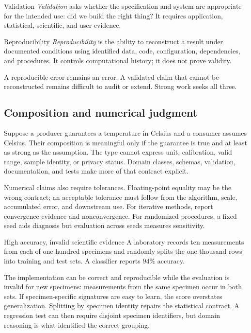 \begin{definitionbox}{Validation}
\emph{Validation} asks whether the specification and system are appropriate for
the intended use: did we build the right thing? It requires application,
statistical, scientific, and user evidence.
\end{definitionbox}

\begin{definitionbox}{Reproducibility}
\emph{Reproducibility} is the ability to reconstruct a result under documented
conditions using identified data, code, configuration, dependencies, and
procedures. It controls computational history; it does not prove validity.
\end{definitionbox}

A reproducible error remains an error. A validated claim that cannot be
reconstructed remains difficult to audit or extend. Strong work seeks all
three.

\subsection{Composition and numerical judgment}

Suppose a producer guarantees a temperature in Celsius and a consumer assumes
Celsius. Their composition is meaningful only if the guarantee is true and at
least as strong as the assumption. The type  cannot express unit,
calibration, valid range, sample identity, or privacy status. Domain classes,
schemas, validation, documentation, and tests make more of that contract
explicit.

Numerical claims also require tolerances. Floating-point equality may be the
wrong contract; an acceptable tolerance must follow from the algorithm, scale,
accumulated error, and downstream use. For iterative methods, report convergence
evidence and nonconvergence. For randomized procedures, a fixed seed aids
diagnosis but evaluation across seeds measures sensitivity.

\begin{workedexample}{High accuracy, invalid scientific evidence}
A laboratory records ten measurements from each of one hundred specimens and
randomly splits the one thousand rows into training and test sets. A classifier
reports \(94\%\) accuracy.

The implementation can be correct and reproducible while the evaluation is
invalid for new specimens: measurements from the same specimen occur in both
sets. If specimen-specific signatures are easy to learn, the score overstates
generalization. Splitting by specimen identity repairs the statistical
contract. A regression test can then require disjoint specimen identifiers,
but domain reasoning is what identified the correct grouping.
\end{workedexample}

